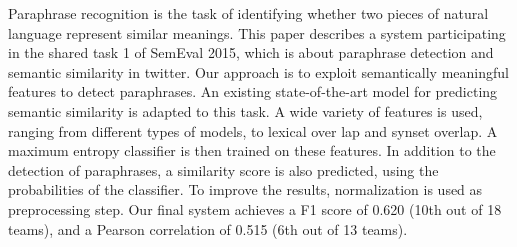 Paraphrase recognition is the task of identifying whether two pieces of natural language represent similar meanings. This paper describes a system participating in the shared task 1 of SemEval 2015, which is about paraphrase detection and semantic similarity in twitter. Our approach is to exploit semantically meaningful features to detect paraphrases. An existing state-of-the-art model for predicting semantic similarity is adapted to this task. A wide variety of features is used, ranging from different types of models, to lexical over lap and synset overlap. A maximum entropy classifier is then trained on these features. In addition to the detection of paraphrases, a similarity score is also predicted, using the probabilities of the classifier. To improve the results, normalization is used as preprocessing step. Our final system achieves a F1 score of 0.620 (10th out of 18 teams), and a Pearson correlation of 0.515 (6th out of 13 teams).
